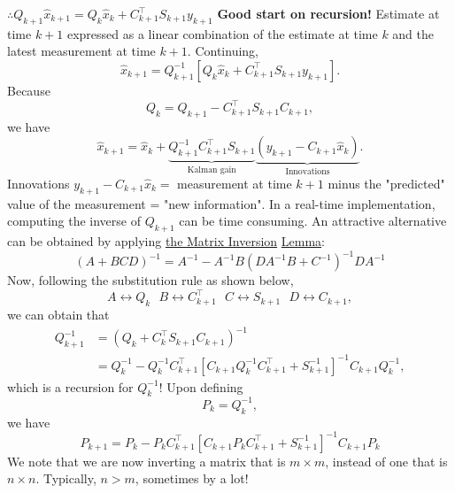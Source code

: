 \documentclass[letterpaper]{article}
\begin{document}
    \underline{$\therefore Q_{k+1}\hat{x}_{k+1}=Q_k\hat{x}_k+C_{k+1}^\top S_{k+1}y_{k+1}$}
    \newline\newline
    \textbf{Good start on recursion!} Estimate at time $k+1$ expressed as a linear combination of the estimate at time $k$ and the latest measurement at time $k+1$.
    \newline\newline
    Continuing,
    \begin{equation*}
        \hat{x}_{k+1}=Q_{k+1}^{-1}\left[Q_k\hat{x}_k+C_{k+1}^\top S_{k+1}y_{k+1}\right].
    \end{equation*}
    Because
    \begin{equation*}
        Q_k=Q_{k+1}-C_{k+1}^\top S_{k+1}C_{k+1},
    \end{equation*}
    we have
    \begin{equation*}
        \hat{x}_{k+1}=\hat{x}_k+\underbrace{Q_{k+1}^{-1}C_{k+1}^\top S_{k+1}}_{\text{Kalman gain}} \underbrace{(y_{k+1}-C_{k+1}\hat{x}_k)}_{\text{Innovations}}.
    \end{equation*}
    \newline
    Innovations  $y_{k+1}-C_{k+1}\hat{x}_k=$ measurement at time $k+1$ minus the "predicted" value of the measurement = "new information".
    \newline\newline
    In a real-time implementation, computing the inverse of $Q_{k+1}$ can be time consuming. An attractive alternative can be obtained by applying \underline{the Matrix Inversion} \underline{Lemma}:
    \begin{equation*}
        \left(A+BCD\right)^{-1}=A^{-1}-A^{-1}B\left(DA^{-1}B+C^{-1}\right)^{-1}DA^{-1}
    \end{equation*}
    Now, following the substitution rule as shown below,
    \begin{equation*}
        A\leftrightarrow Q_k\ \ \ B\leftrightarrow C_{k+1}^\top\ \ \ C\leftrightarrow S_{k+1}\ \ \ D\leftrightarrow C_{k+1},
    \end{equation*}
    we can obtain that
    \begin{align*}
        Q_{k+1}^{-1}&=\left(Q_k+C_k^\top S_{k+1}C_{k+1}\right)^{-1}\\
        &=Q_k^{-1}-Q_k^{-1}C_{k+1}^\top\left[C_{k+1}Q_k^{-1}C_{k+1}^\top+S_{k+1}^{-1}\right]^{-1}C_{k+1}Q_k^{-1},
    \end{align*}
    which is a recursion for $Q_k^{-1}$!
    \newline\newline
    Upon defining
    \begin{equation*}
        P_k=Q_k^{-1},
    \end{equation*}
    we have
    \begin{equation*}
        P_{k+1}=P_k-P_kC_{k+1}^\top\left[C_{k+1}P_kC_{k+1}^\top+S_{k+1}^{-1}\right]^{-1}C_{k+1}P_k
    \end{equation*}
    We note that we are now inverting a matrix that is $m\times m$, instead of one that is $n\times n$. Typically, $n>m$, sometimes by a lot!
\end{document}
